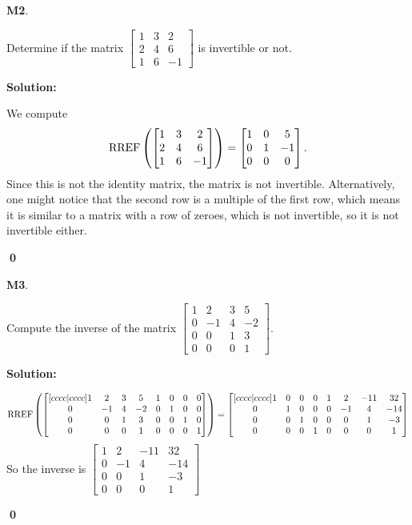 \documentclass{article}
\newenvironment{problem}[1]
{
  \begin{flushleft}
  \textbf{#1}.
  \ignorespaces
}
{
  \end{flushleft}
}
\newenvironment{solution}
{
  \ignorespaces
  \textbf{Solution:}
}
{
  \ignorespacesafterend
  \begin{flushright}
  {\bfseries \qed}
  \end{flushright}
}
\begin{document}
\begin{problem}{M2}
Determine if the matrix \(\begin{bmatrix}1 & 3 & 2  \\ 2 & 4 & 6  \\ 1 & 6 & -1 \end{bmatrix}\) is invertible or not.
\end{problem}
\begin{solution}
We compute 
\[\operatorname{RREF}\left(\begin{bmatrix}1 & 3 & 2  \\ 2 & 4 & 6  \\ 1 & 6 & -1 \end{bmatrix}\right) = \begin{bmatrix} 1 & 0 & 5 \\ 0 & 1 & -1 \\ 0 & 0 & 0 \end{bmatrix}.\]
Since this is not the identity matrix, the matrix is not invertible.  Alternatively, one might notice that the second row is a multiple of the first row, which means it is similar to a matrix with a row of zeroes, which is not invertible, so it is not invertible either.
\end{solution}

\begin{problem}{M3}
Compute the inverse of the matrix $\begin{bmatrix} 1 & 2 & 3 & 5 \\ 0 & -1 & 4 & -2 \\ 0 & 0 & 1 & 3 \\ 0 & 0 & 0 & 1 \end{bmatrix}$.
\end{problem}
\begin{solution}
$$\operatorname{RREF}\left(\begin{bmatrix}[cccc|cccc] 1 & 2 & 3 & 5 & 1 & 0 & 0 & 0  \\ 0 & -1 & 4 & -2 & 0 & 1 & 0 & 0 \\ 0 & 0 & 1 & 3 & 0 & 0 & 1 & 0 \\ 0 & 0 & 0 & 1 & 0 & 0 & 0 & 1 \end{bmatrix}\right) = \begin{bmatrix}[cccc|cccc] 1 & 0 & 0 &0 & 1 & 2 & -11 & 32 \\ 0 & 1 & 0 & 0 & 0 & -1 & 4 & -14 \\ 0 & 0 & 1 & 0 & 0 & 0 & 1 & -3 \\ 0 & 0 & 0 & 1 & 0 & 0 & 0 & 1 \end{bmatrix}$$
So the inverse is $\begin{bmatrix}  1 & 2 & -11 & 32 \\ 0 & -1 & 4 & -14 \\  0 & 0 & 1 & -3 \\ 0 & 0 & 0 & 1 \end{bmatrix}$
\end{solution}
\end{document}
